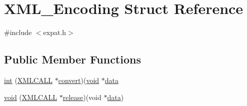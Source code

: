 \hypertarget{struct_x_m_l___encoding}{}\section{X\+M\+L\+\_\+\+Encoding Struct Reference}
\label{struct_x_m_l___encoding}


{\ttfamily \#include $<$expat.\+h$>$}

\subsection*{Public Member Functions}
\begin{DoxyCompactItemize}
\item 
\hyperlink{struct_x_m_l___encoding_a0e78058177f2573fd3e3597cfea390ef}{int} (\hyperlink{expat__external_8h_aad85d290912c3ffed7a2ec0b6173dad3}{X\+M\+L\+C\+A\+LL} $\ast$\hyperlink{struct_x_m_l___encoding_acb3c6f1c67b33d08f2cfeebf4a778691}{convert})(\hyperlink{struct_x_m_l___encoding_a8af470efc752980eaed0893cd1a2353a}{void} $\ast$\hyperlink{lib_2expat_8h_ac39e72a1de1cb50dbdc54b08d0432a24}{data}
\item 
\hyperlink{struct_x_m_l___encoding_a8af470efc752980eaed0893cd1a2353a}{void} (\hyperlink{expat__external_8h_aad85d290912c3ffed7a2ec0b6173dad3}{X\+M\+L\+C\+A\+LL} $\ast$\hyperlink{struct_x_m_l___encoding_a0fc52048916349f611a96d2be907c75e}{release})(void $\ast$\hyperlink{lib_2expat_8h_ac39e72a1de1cb50dbdc54b08d0432a24}{data})
\end{DoxyCompactItemize}

